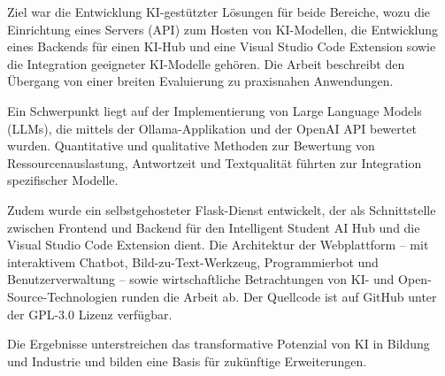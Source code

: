 {Ziel war die Entwicklung KI-gestützter Lösungen für beide Bereiche, wozu die Einrichtung eines Servers (API) zum Hosten von KI-Modellen, die Entwicklung eines Backends für einen KI-Hub und eine Visual Studio Code Extension sowie die Integration geeigneter KI-Modelle gehören. Die Arbeit beschreibt den Übergang von einer breiten Evaluierung zu praxisnahen Anwendungen.
    
Ein Schwerpunkt liegt auf der Implementierung von Large Language Models (LLMs), die mittels der Ollama-Applikation und der OpenAI API bewertet wurden. Quantitative und qualitative Methoden zur Bewertung von Ressourcenauslastung, Antwortzeit und Textqualität führten zur Integration spezifischer Modelle.
    
Zudem wurde ein selbstgehosteter Flask-Dienst entwickelt, der als Schnittstelle zwischen Frontend und Backend für den Intelligent Student AI Hub und die Visual Studio Code Extension dient. Die Architektur der Webplattform – mit interaktivem Chatbot, Bild-zu-Text-Werkzeug, Programmierbot und Benutzerverwaltung – sowie wirtschaftliche Betrachtungen von KI- und Open-Source-Technologien runden die Arbeit ab. Der Quellcode ist auf GitHub unter der GPL-3.0 Lizenz verfügbar.
    
Die Ergebnisse unterstreichen das transformative Potenzial von KI in Bildung und Industrie und bilden eine Basis für zukünftige Erweiterungen.    
}